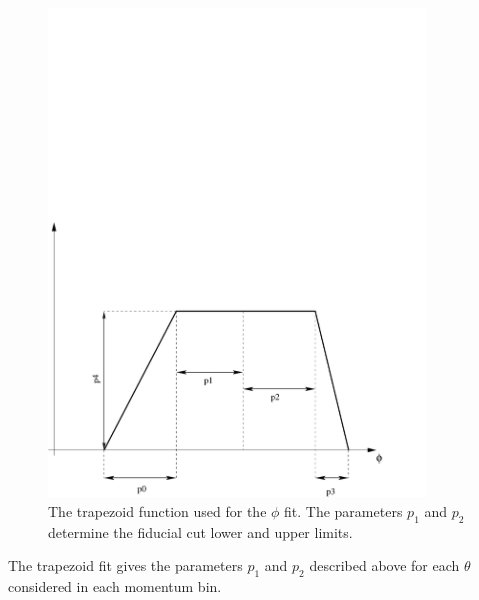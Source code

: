 \vspace{-0.5cm}
\begin{figure}[h]
 \begin{center}
 \includegraphics[width = 10cm, bb=-40 20 580 440]{img/traped}
  \caption[The trapezoid function used for the $\phi$ fit]
          { The trapezoid function used for the $\phi$ fit. The parameters $p_1$ and $p_2$ determine
                     the fiducial cut lower and upper limits.  }
 \label{fig:traped}
 \end{center}
\end{figure}
The trapezoid fit gives the parameters $p_1$ and $p_2$ described above for each $\theta$ considered
in each momentum bin.